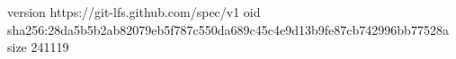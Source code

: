 version https://git-lfs.github.com/spec/v1
oid sha256:28da5b5b2ab82079eb5f787c550da689c45c4e9d13b9fe87cb742996bb77528a
size 241119
